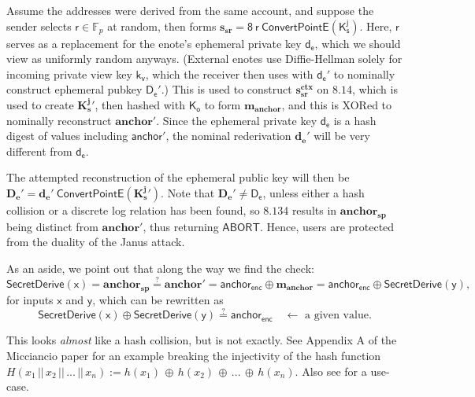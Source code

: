 \documentclass{article}
\theoremstyle{definition}
\newcommand{\Fp}{\mathbb{F}_p}
\newcommand{\6}{\mathbf}
\newcommand{\7}{\mathcal}
\renewcommand{\line}[1]{{\text{Section }$8.1$\text{, line }#1}}
\newcommand{\secr}[1]{{\mathsf{SecretDerive}(\sf{#1})}}
\renewcommand{\sf}[1]{{\mathsf{#1}}}
\newcommand{\sfb}[1]{{\mathsf{\mathbf{#1}}}}
\begin{document}
Assume the addresses were derived from the same account, and suppose the sender selects $\sf{r} \in \Fp$ at random, then forms $\sfb{s_{sr}} = \sf{8 \ r \ ConvertPointE(K_s^{j})}$. Here, $\sf{r}$ serves as a replacement for the enote's ephemeral private key $\sf{d_e}$, which we should view as uniformly random anyways. (External enotes use Diffie-Hellman solely for incoming private view key $\sf{k_v}$, which the receiver then uses with $\sf{d_e}'$ to nominally construct ephemeral pubkey $\sf{D_e}'$.) This is used to construct $\sfb{s_{sr}^{ctx}}$ on \line{4}, which is used to create $\sfb{K_s^j}'$, then hashed with $\sf{K_o}$ to form $\sfb{m_{anchor}}$, and this is XORed to nominally reconstruct $\sfb{anchor}'$. Since the ephemeral private key $\sf{d_e}$ is a hash digest of values including $\sf{anchor}'$, the nominal rederivation $\sfb{d_e}'$ will be very different from $\sf{d_e}$.
\medskip 

The attempted reconstruction of the ephemeral public key will then be $\sfb{D_e}' = \sfb{d_e}' \ \sf{ConvertPointE}(\sfb{K_s^j}')$. 
Note that $\sfb{D_e}' \neq \sf{D_e}$, unless either a hash collision or a discrete log relation has been found, so \line{34} results in $\sfb{anchor_{sp}}$ being distinct from $\sfb{anchor}'$, thus returning $\sf{ABORT}$. Hence, users are protected from the duality of the Janus attack. 
\bigskip 

As an aside, we point out that along the way we find the check: 
$$\secr{x} = \sfb{anchor_{sp}} \stackrel{?}{=} \sfb{anchor}' = \sf{anchor_{enc}} \oplus \sfb{m_{anchor}} = \sf{anchor_{enc}} \oplus \secr{y},$$
for inputs $\sf{x}$ and $\sf{y}$, which can be rewritten as
$$\secr{x} \oplus \secr{y} \stackrel{?}{=} \sf{anchor_{enc}} \quad \leftarrow \text{ a given value}.$$

This looks \textit{almost} like a hash collision, but is not exactly. See Appendix A of the Micciancio paper \cite{Micciancio} for an example breaking the injectivity of the hash function $H(x_1 \, || \, x_2 \, || \, ... \, || \, x_n) := h(x_1) \, \oplus \, h(x_2) \, \oplus \, ... \, \oplus \, h(x_n)$. Also see \cite{CollisionGenerator} for a use-case. 
\medskip 
\end{document}
